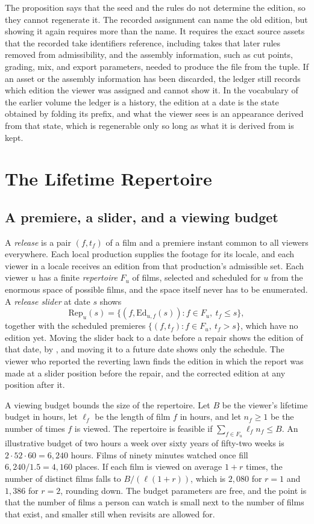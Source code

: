 \documentclass[11pt,twoside,openright]{book}
\theoremstyle{plain}
\theoremstyle{definition}
\theoremstyle{remark}
\begin{document}
The proposition says that the seed and the rules do not determine the edition, so they cannot regenerate it. The recorded assignment can name the old edition, but showing it again requires more than the name. It requires the exact source assets that the recorded take identifiers reference, including takes that later rules removed from admissibility, and the assembly information, such as cut points, grading, mix, and export parameters, needed to produce the file from the tuple. If an asset or the assembly information has been discarded, the ledger still records which edition the viewer was assigned and cannot show it. In the vocabulary of the earlier volume the ledger is a history, the edition at a date is the state obtained by folding its prefix, and what the viewer sees is an appearance derived from that state, which is regenerable only so long as what it is derived from is kept.

\section{The Lifetime Repertoire}\label{sec:repertoire}

\subsection{A premiere, a slider, and a viewing budget}

A \emph{release} is a pair $(f,t_f)$ of a film and a premiere instant common to all viewers everywhere. Each local production supplies the footage for its locale, and each viewer in a locale receives an edition from that production's admissible set. Each viewer $u$ has a finite \emph{repertoire} $F_u$ of films, selected and scheduled for $u$ from the enormous space of possible films, and the space itself never has to be enumerated. A \emph{release slider} at date $s$ shows
\[
\mathrm{Rep}_u(s)=\bigl\{(f,\mathrm{Ed}_{u,f}(s)):f\in F_u,\ t_f\le s\bigr\},
\]
together with the scheduled premieres $\{(f,t_f):f\in F_u,\ t_f>s\}$, which have no edition yet. Moving the slider back to a date before a repair shows the edition of that date, by , and moving it to a future date shows only the schedule. The viewer who reported the reverting lawn finds the edition in which the report was made at a slider position before the repair, and the corrected edition at any position after it.

A viewing budget bounds the size of the repertoire. Let $B$ be the viewer's lifetime budget in hours, let $\ell_f$ be the length of film $f$ in hours, and let $n_f\ge1$ be the number of times $f$ is viewed. The repertoire is feasible if $\sum_{f\in F_u}\ell_fn_f\le B$. An illustrative budget of two hours a week over sixty years of fifty-two weeks is $2\cdot52\cdot60=6{,}240$ hours. Films of ninety minutes watched once fill $6{,}240/1.5=4{,}160$ places. If each film is viewed on average $1+r$ times, the number of distinct films falls to $B/(\ell(1+r))$, which is $2{,}080$ for $r=1$ and $1{,}386$ for $r=2$, rounding down. The budget parameters are free, and the point is that the number of films a person can watch is small next to the number of films that exist, and smaller still when revisits are allowed for.
\end{document}
